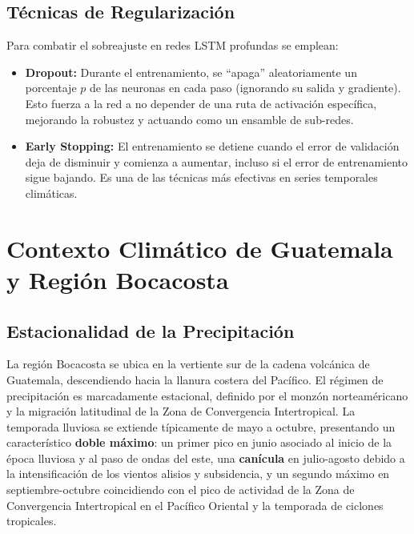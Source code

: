 \subsection{Técnicas de Regularización}
Para combatir el sobreajuste en redes LSTM profundas se emplean:
\begin{itemize}
    \item \textbf{Dropout:} Durante el entrenamiento, se ``apaga'' aleatoriamente un porcentaje \(p\) de las neuronas en cada paso (ignorando su salida y gradiente). Esto fuerza a la red a no depender de una ruta de activación específica, mejorando la robustez y actuando como un ensamble de sub-redes.
    \item \textbf{Early Stopping:} El entrenamiento se detiene cuando el error de validación deja de disminuir y comienza a aumentar, incluso si el error de entrenamiento sigue bajando. Es una de las técnicas más efectivas en series temporales climáticas.
\end{itemize}

\section{Contexto Climático de Guatemala y Región Bocacosta}

\subsection{Estacionalidad de la Precipitación}
La región Bocacosta se ubica en la vertiente sur de la cadena volcánica de Guatemala, descendiendo hacia la llanura costera del Pacífico. El régimen de precipitación es marcadamente estacional, definido por el monzón norteaméricano y la migración latitudinal de la Zona de Convergencia Intertropical. La temporada lluviosa se extiende típicamente de mayo a octubre, presentando un característico \textbf{doble máximo}: un primer pico en junio asociado al inicio de la época lluviosa y al paso de ondas del este, una \textbf{canícula} en julio-agosto debido a la intensificación de los vientos alisios y subsidencia, y un segundo máximo en septiembre-octubre coincidiendo con el pico de actividad de la Zona de Convergencia Intertropical en el Pacífico Oriental y la temporada de ciclones tropicales.

